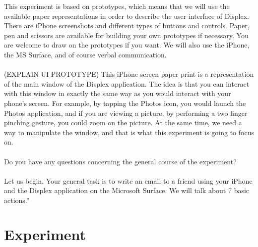 This experiment is based on prototypes, which means that we will use the available paper representations in order to describe the user interface of Displex.
There are iPhone screenshots and different types of buttons and controls.
Paper, pen and scissors are available for building your own prototypes if necessary.
You are welcome to draw on the prototypes if you want.
We will also use the iPhone, the MS Surface, and of course verbal communication.
\\\\
(EXPLAIN UI PROTOTYPE)
This iPhone screen paper print is a representation of the main window of the Displex application.
The idea is that you can interact with this window in exactly the same way as you would interact with your phone's screen.
For example, by tapping the Photos icon, you would launch the Photos application, and if you are viewing a picture, by performing a two finger pinching gesture, you could zoom on the picture.
At the same time, we need a way to manipulate the window, and that is what this experiment is going to focus on. 
\\\\
Do you have any questions concerning the general course of the experiment?
\\\\
Let us begin.
Your general task is to write an email to a friend using your iPhone and the Displex application on the Microsoft Surface.
We will talk about 7 basic actions.''

\section{Experiment}

